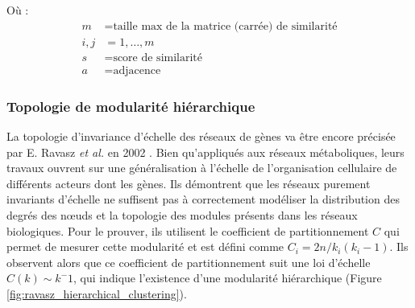 Où :
\begin{align*}
    m &= \text{taille max de la matrice (carrée) de similarité} \\
    i, j &= 1, \dots, m \\
    s &= \text{score de similarité} \\
    a &= \text{adjacence}
\end{align*}


\subsubsection{Topologie de modularité hiérarchique}

La topologie d'invariance d'échelle des réseaux de gènes va être encore précisée par E. Ravasz \textit{et al.} en 2002 \cite{Ravasz2002}. Bien qu'appliqués aux réseaux métaboliques, leurs travaux ouvrent sur une généralisation à l'échelle de l'organisation cellulaire de différents acteurs dont les gènes. Ils démontrent que les réseaux purement invariants d'échelle ne suffisent pas à correctement modéliser la distribution des degrés des nœuds et la topologie des modules présents dans les réseaux biologiques. Pour le prouver, ils utilisent le coefficient de partitionnement $C$ qui permet de mesurer cette modularité et est défini comme $C_{i}=2 n / k_{i}\left(k_{i}-1\right)$. Ils observent alors que ce coefficient de partitionnement suit une loi d'échelle $C(k) \sim k^-1$, qui indique l'existence d'une modularité hiérarchique (Figure \ref{fig:ravasz_hierarchical_clustering}).

